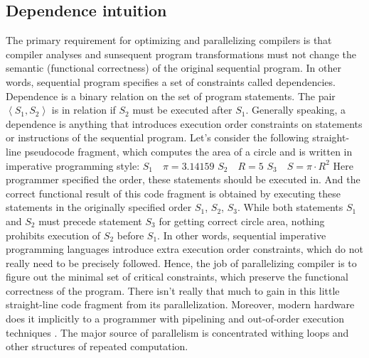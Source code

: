 \subsection{Dependence intuition} 
\label{background-dependence-intuition}
\qquad The primary requirement for optimizing and parallelizing compilers is that compiler analyses and sunsequent program transformations must not change the semantic (functional correctness) of the original sequential program. In other words, sequential program specifies a set of constraints called dependencies.\newline
\null\qquad Dependence is a binary relation on the set of program statements. The pair $\left\langle S_{1},S_{2}\right\rangle $ is in relation if $S_{2}$ must be executed after $S_{1}$. Generally speaking, a dependence is anything that introduces execution order constraints on statements or instructions of the sequential program.\newline
\null\qquad Let's consider the following straight-line pseudocode fragment, which computes the area of a circle and is written in imperative programming style:\newline
$S_{1}\quad\pi=3.14159$\newline
$S_{2}\quad R=5$\newline
$S_{3}\quad S=\pi\cdot R^{2}$\newline
\null\qquad Here programmer specified the order, these statements should be executed in. And the correct functional result of this code fragment is obtained by executing these statements in the originally specified order $S_{1}$, $S_{2}$, $S_{3}$. While both statements $S_{1}$ and $S_{2}$ must precede statement $S_{3}$ for getting correct circle area, nothing prohibits execution of $S_{2}$ before $S_{1}$. In other words, sequential imperative programming languages introduce extra execution order constraints, which do not really need to be precisely followed.\newline
\null\qquad Hence, the job of parallelizing compiler is to figure out the minimal set of critical constraints, which preserve the functional correctness of the program. There isn't really that much to gain in this little straight-line code fragment from its parallelization. Moreover, modern hardware does it implicitly to a programmer with pipelining \cite{patterson-and-hennessy-cod} and out-of-order execution techniques \cite{patterson-and-hennessy-quantitative-approach}. The major source of parallelism is concentrated withing loops and other structures of repeated computation.   
